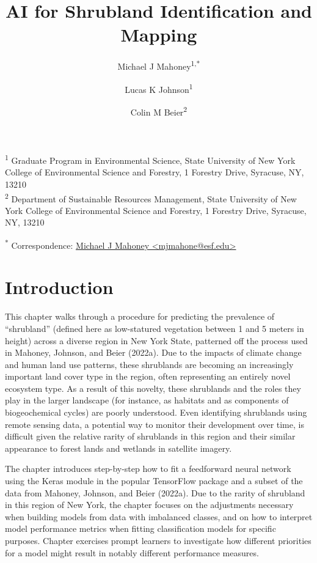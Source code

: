 \documentclass[
  letterpaper,
  DIV=11,
  numbers=noendperiod]{scrartcl}
\title{AI for Shrubland Identification and Mapping}
\author{Michael J Mahoney\textsuperscript{1,*} \and Lucas K Johnson\textsuperscript{1} \and Colin M Beier\textsuperscript{2}}
\date{}
\begin{document}
\maketitle
\ifdefined\Shaded\renewenvironment{Shaded}{\begin{tcolorbox}[frame hidden, interior hidden, borderline west={3pt}{0pt}{shadecolor}, boxrule=0pt, enhanced, breakable, sharp corners]}{\end{tcolorbox}}\fi

\textsuperscript{1} Graduate Program in Environmental Science, State
University of New York College of Environmental Science and Forestry, 1
Forestry Drive, Syracuse, NY, 13210\\
\textsuperscript{2} Department of Sustainable Resources Management,
State University of New York College of Environmental Science and
Forestry, 1 Forestry Drive, Syracuse, NY, 13210

\textsuperscript{*} Correspondence:
\href{mailto:mjmahone@esf.edu}{Michael J Mahoney
\textless{}mjmahone@esf.edu\textgreater{}}

\hypertarget{introduction}{%
\section{Introduction}\label{introduction}}

This chapter walks through a procedure for predicting the prevalence of
``shrubland'' (defined here as low-statured vegetation between 1 and 5
meters in height) across a diverse region in New York State, patterned
off the process used in Mahoney, Johnson, and Beier (2022a). Due to the
impacts of climate change and human land use patterns, these shrublands
are becoming an increasingly important land cover type in the region,
often representing an entirely novel ecosystem type. As a result of this
novelty, these shrublands and the roles they play in the larger
landscape (for instance, as habitats and as components of biogeochemical
cycles) are poorly understood. Even identifying shrublands using remote
sensing data, a potential way to monitor their development over time, is
difficult given the relative rarity of shrublands in this region and
their similar appearance to forest lands and wetlands in satellite
imagery.

The chapter introduces step-by-step how to fit a feedforward neural
network using the Keras module in the popular TensorFlow package and a
subset of the data from Mahoney, Johnson, and Beier (2022a). Due to the
rarity of shrubland in this region of New York, the chapter focuses on
the adjustments necessary when building models from data with imbalanced
classes, and on how to interpret model performance metrics when fitting
classification models for specific purposes. Chapter exercises prompt
learners to investigate how different priorities for a model might
result in notably different performance measures.
\end{document}
